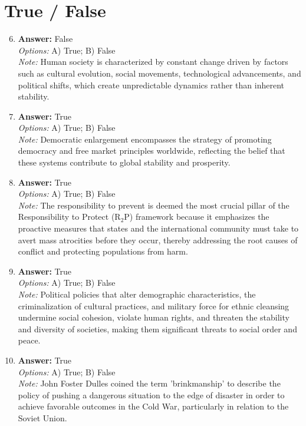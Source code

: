 \documentclass[12pt]{article}
\begin{document}
\section*{True / False}
\begin{enumerate}[label=\arabic*.]
\setcounter{enumi}{5}
\item \textbf{Answer:} False
\\ \textit{Options:} A) True; B) False
\\ \textit{Note:} Human society is characterized by constant change driven by factors such as cultural evolution, social movements, technological advancements, and political shifts, which create unpredictable dynamics rather than inherent stability.
\item \textbf{Answer:} True
\\ \textit{Options:} A) True; B) False
\\ \textit{Note:} Democratic enlargement encompasses the strategy of promoting democracy and free market principles worldwide, reflecting the belief that these systems contribute to global stability and prosperity.
\item \textbf{Answer:} True
\\ \textit{Options:} A) True; B) False
\\ \textit{Note:} The responsibility to prevent is deemed the most crucial pillar of the Responsibility to Protect (R$_{2}$P) framework because it emphasizes the proactive measures that states and the international community must take to avert mass atrocities before they occur, thereby addressing the root causes of conflict and protecting populations from harm.
\item \textbf{Answer:} True
\\ \textit{Options:} A) True; B) False
\\ \textit{Note:} Political policies that alter demographic characteristics, the criminalization of cultural practices, and military force for ethnic cleansing undermine social cohesion, violate human rights, and threaten the stability and diversity of societies, making them significant threats to social order and peace.
\item \textbf{Answer:} True
\\ \textit{Options:} A) True; B) False
\\ \textit{Note:} John Foster Dulles coined the term 'brinkmanship' to describe the policy of pushing a dangerous situation to the edge of disaster in order to achieve favorable outcomes in the Cold War, particularly in relation to the Soviet Union.
\end{enumerate}
\end{document}

